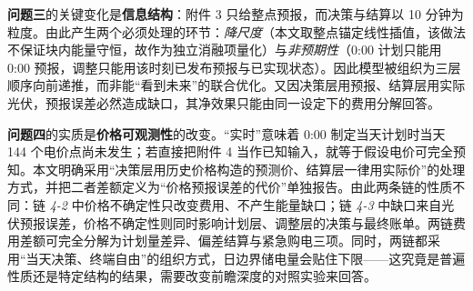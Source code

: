 \textbf{问题三}的关键变化是\textbf{信息结构}：附件 3 只给整点预报，而决策与结算以 10 分钟为粒度。由此产生两个必须处理的环节：\emph{降尺度}（本文取整点锚定线性插值，该做法不保证块内能量守恒，故作为独立消融项量化）与\emph{非预期性}（0:00 计划只能用 0:00 预报，调整只能用该时刻已发布预报与已实现状态）。因此模型被组织为三层顺序向前递推，而非能“看到未来”的联合优化。又因决策层用预报、结算层用实际光伏，预报误差必然造成缺口，其净效果只能由同一设定下的费用分解回答。

\textbf{问题四}的实质是\textbf{价格可观测性}的改变。“实时”意味着 0:00 制定当天计划时当天 144 个电价点尚未发生；若直接把附件 4 当作已知输入，就等于假设电价可完全预知。本文明确采用“决策层用历史价格构造的预测价、结算层一律用实际价”的处理方式，并把二者差额定义为“价格预报误差的代价”单独报告。由此两条链的性质不同：链 \emph{4-2} 中价格不确定性只改变费用、不产生能量缺口；链 \emph{4-3} 中缺口来自光伏预报误差，价格不确定性则同时影响计划层、调整层的决策与最终账单。两链费用差额可完全分解为计划量差异、偏差结算与紧急购电三项。同时，两链都采用“当天决策、终端自由”的组织方式，日边界储电量会贴住下限——这究竟是普遍性质还是特定结构的结果，需要改变前瞻深度的对照实验来回答。
